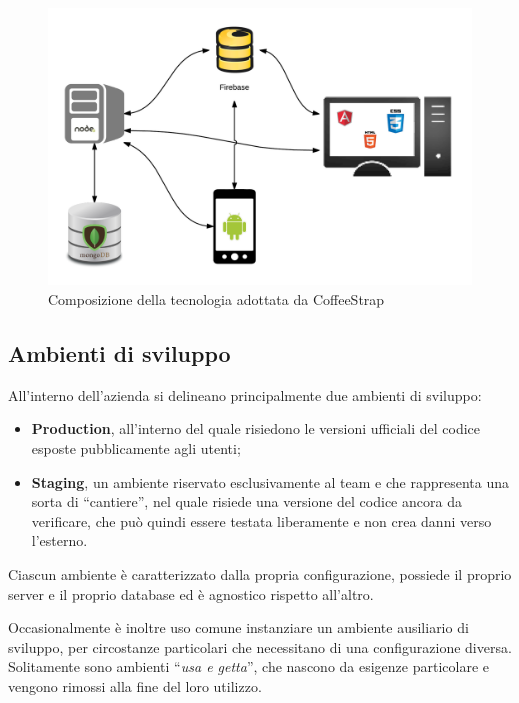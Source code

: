 \begin{figure}[htpd]
\centering
\includegraphics[width=\textwidth]{../immagini/stack-composition}
\caption{Composizione della tecnologia adottata da CoffeeStrap}  
\end{figure}

\subsection{Ambienti di sviluppo}

All'interno dell'azienda si delineano principalmente due ambienti di sviluppo:

\begin{itemize}

\item \textbf{Production}, all'interno del quale risiedono le versioni ufficiali del codice esposte pubblicamente agli utenti;

\item \textbf{Staging}, un ambiente riservato esclusivamente al team e che rappresenta una sorta di ``cantiere'', nel quale risiede una versione del codice ancora da verificare, che può quindi essere testata liberamente e non crea danni verso l'esterno.

\end{itemize}

Ciascun ambiente è caratterizzato dalla propria configurazione, possiede il proprio server e il proprio database ed è agnostico rispetto all'altro.

Occasionalmente è inoltre uso comune instanziare un ambiente ausiliario di sviluppo, per circostanze particolari che necessitano di una configurazione diversa. Solitamente sono ambienti ``\textit{usa e getta}'', che nascono da esigenze particolare e vengono rimossi alla fine del loro utilizzo.

